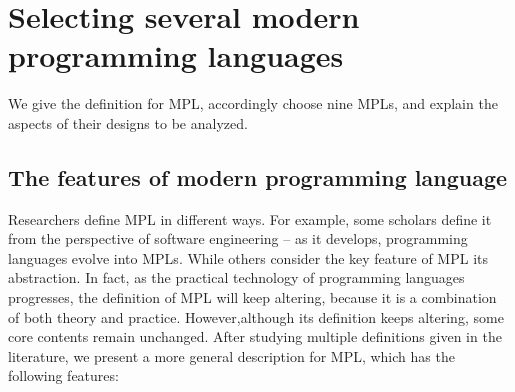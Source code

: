 \section{Selecting several modern programming languages}

We give the definition for MPL, accordingly choose nine MPLs,
and explain the aspects of their designs to be analyzed.



\subsection{The features of modern programming language}

Researchers define MPL in different ways.
For example, some scholars define it from the perspective of software
engineering – as it develops, programming languages evolve into MPLs\cite{ModernProgrammingLanguagesSoftwareEnginerring}.
While others consider the key feature of MPL its abstraction\cite{ModernProgrammingLanguagesAbstraction}.
In fact, as the practical technology of programming languages progresses,
the definition of MPL will keep altering, because it is a combination
of both theory and practice.
However,although its definition keeps altering,
some core contents remain unchanged.
After studying multiple definitions given in the literature, we present a
more general description for MPL, which has the following features:


